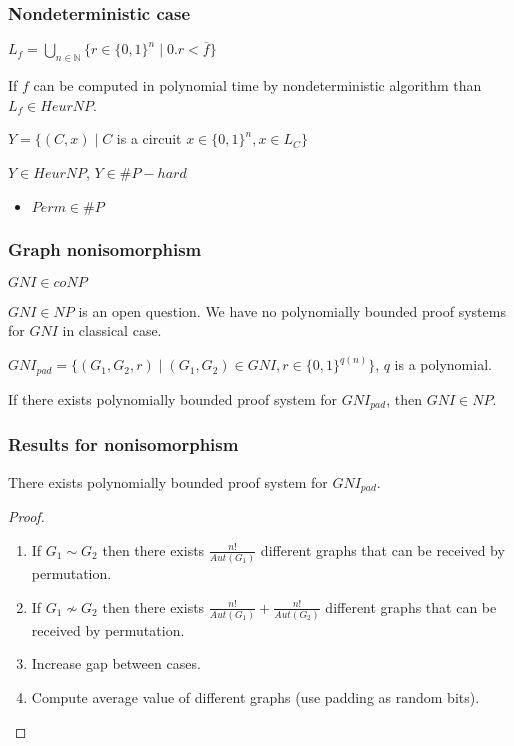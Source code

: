 \begin{frame}
    \frametitle{Nondeterministic case}

    $L_f = \bigcup\limits_{n \in \mathbb{N}}\{r \in \{0, 1\}^n \mid 0.r <
    \overline{f}\}$

    \begin{lemma}
        If $f$ can be computed in polynomial time by nondeterministic algorithm than
        $L_f \in HeurNP$.
    \end{lemma}
    
	$Y = \{(C, x) \mid C$ is a circuit $x \in \{0, 1\}^n, x \in L_{C}\}$
    
    \begin{lemma}
        $Y \in HeurNP$, $Y \in \#P-hard$
    \end{lemma}

    \begin{itemize}
	    \item $Perm \in \#P$
    \end{itemize}
    
\end{frame}

\begin{frame}
    \frametitle{Graph nonisomorphism}

    $GNI \in coNP$
    
    $GNI \in NP$ is an open question. We have no polynomially bounded proof systems
    for $GNI$ in classical case.


    \begin{definition}
        $GNI_{pad} = \{(G_1, G_2, r) \mid (G_1, G_2) \in GNI,
        r \in \{0, 1\}^{q(n)}\}$, $q$ is a polynomial.
    \end{definition}

    \begin{lemma}
        If there exists polynomially bounded proof system for
        $GNI_{pad}$, then $GNI \in NP$.
    \end{lemma}
\end{frame}

\begin{frame}
    \frametitle{Results for nonisomorphism}

    \begin{theorem}
        There exists polynomially bounded proof system for $GNI_{pad}$.
    \end{theorem}

    \begin{proof}
        \begin{enumerate}
	        \item If $G_1 \sim G_2$ then there exists $\frac{n!}{Aut(G_1)}$ different
		        graphs that can be received by permutation.
            \item If $G_1 \nsim G_2$ then there exists $\frac{n!}{Aut(G_1)} +
		        \frac{n!}{Aut(G_2)}$ different graphs that can be received by permutation.
            \item Increase gap between cases.
        	\item Compute average value of different graphs (use padding as random bits).
        \end{enumerate}
    \end{proof}
\end{frame}